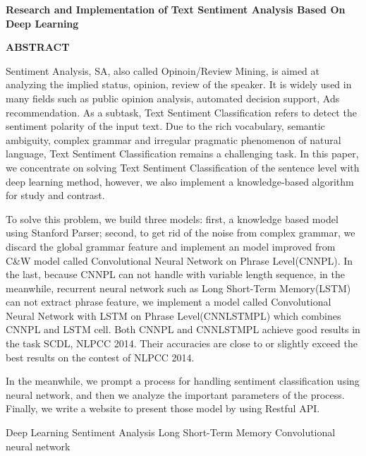 \begin{center}  
\textbf{Research and Implementation of Text Sentiment Analysis Based On Deep Learning}
\end{center}
\begin{center}  
\textbf{ABSTRACT}
\end{center}
\vspace{2mm}

Sentiment Analysis, SA, also called Opinoin/Review Mining, is aimed at analyzing the implied status, opinion, review of the speaker. It is widely used in many fields such as public opinion analysis, automated decision support, Ads recommendation. As a subtask, Text Sentiment Classification refers to detect the sentiment polarity of the input text. Due to the rich vocabulary, semantic ambiguity, complex grammar and irregular pragmatic phenomenon of natural language, Text Sentiment Classification remains a challenging task. In this paper, we concentrate on solving Text Sentiment Classification of the sentence level with deep learning method, however, we also implement a knowledge-based algorithm for study and contrast.


To solve this problem, we build three models: first, a knowledge based model using Stanford Parser; second, to get rid of the noise from complex grammar, we discard the global grammar feature and implement an model improved from C\&W model called Convolutional Neural Network on Phrase Level(CNNPL). In the last, because CNNPL can not handle with variable length sequence, in the meanwhile, recurrent neural network   such as Long Short-Term Memory(LSTM) can not extract phrase feature, we implement a model called Convolutional Neural Network with LSTM on Phrase Level(CNNLSTMPL) which combines CNNPL and LSTM cell. Both CNNPL and CNNLSTMPL achieve good results in the task SCDL, NLPCC 2014. Their accuracies are close to or slightly exceed the best results on the contest of NLPCC 2014. 


In the meanwhile, we prompt a process for handling sentiment classification using neural network, and then we analyze the important parameters of the process. Finally, we write a website to present those model by using Restful API.

\vspace{3mm}
\quad Deep Learning \quad Sentiment Analysis \quad Long Short-Term Memory \quad Convolutional neural network
